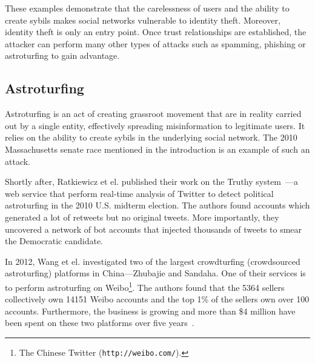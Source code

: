 These examples demonstrate that the carelessness of users and the ability to
create sybils makes social networks vulnerable to identity theft. Moreover,
identity theft is only an entry point. Once trust relationships are established,
the attacker can perform many other types of attacks such as spamming, phishing
or astroturfing to gain advantage.

\subsection{Astroturfing}
Astroturfing is an act of creating grassroot movement that are in reality
carried out by a single entity, effectively spreading misinformation to
legitimate users. It relies on the ability to create sybils in the underlying
social network. The 2010 Massachusetts senate race mentioned in the introduction
is an example of such an attack.

\begin{comment}
In the 2010 Massachusetts senate race, Mustafaraj and Metaxas found evidence
that Republican campaigners created fake Twitter accounts and used them to send
spam. The spam caused Google real-time search results to tip in their favour
thus causing a spread of misinformation~\cite{mustafaraj2010obscurity}.
Ratkiewicz et el. suggest that this type of attack can be mounted cheaply and
may have a larger influence than traditional
advertising~\cite{ratkiewicz2011truthy}.
\end{comment}

Shortly after, Ratkiewicz et el. published their work on the Truthy
system~\cite{ratkiewicz2011truthy}---a web service that perform real-time
analysis of Twitter to detect political astroturfing in the 2010 U.S. midterm
election. The authors found accounts which generated a lot of retweets but no
original tweets. More importantly, they uncovered a network of bot accounts that
injected thousands of tweets to smear the Democratic candidate.

In 2012, Wang et el. investigated two of the largest crowdturfing (crowdsourced
astroturfing) platforms in China---Zhubajie and Sandaha. One of their services
is to perform astroturfing on Weibo\footnote{The Chinese Twitter
  (\texttt{http://weibo.com/}).}. The authors found that the 5364 sellers
collectively own 14151 Weibo accounts and the top 1\% of the sellers own over
100 accounts. Furthermore, the business is growing and more than \$4 million
have been spent on these two platforms over five years~\cite{wang2012serf}.

